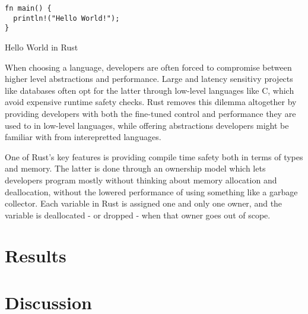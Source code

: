 \documentclass[b5paper]{report}
\begin{document}
\begin{listing}
  \begin{verbatim}
fn main() {
  println!("Hello World!");
}
  \end{verbatim}
  \caption{Hello World in Rust}
\end{listing}

When choosing a language, developers are often forced to compromise between
higher level abstractions and performance. Large and latency sensitivy projects
like databases often opt for the latter through low-level languages like C,
which avoid expensive runtime safety checks. Rust removes this dilemma
altogether by providing developers with both the fine-tuned control and
performance they are used to in low-level languages, while offering abstractions
developers might be familiar with from interepretted languages.

One of Rust's key features is providing compile time safety both in terms of
types and memory. The latter is done through an ownership model which lets
developers program mostly without thinking about memory allocation and
deallocation, without the lowered performance of using something like a garbage
collector. Each variable in Rust is assigned one and only one owner, and the
variable is deallocated - or dropped - when that owner goes out of scope.


\chapter{Results}
\chapter{Discussion}



\end{document}
